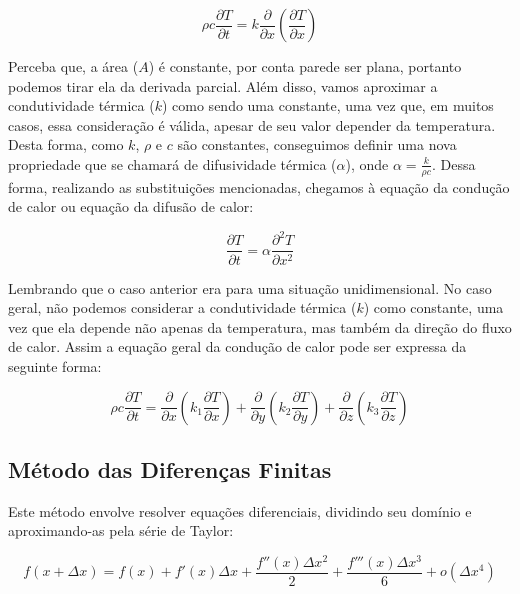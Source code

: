 \documentclass[final,5p,times,twocolumn]{elsarticle}
\begin{document}
\begin{equation*}
    \rho c\frac{\partial T}{\partial t} = k\frac{\partial}{\partial x}(\frac{\partial T}{\partial x})
\end{equation*}

Perceba que, a área ($A$) é constante, por conta parede ser plana, portanto podemos tirar ela da derivada parcial. Além disso, vamos aproximar a condutividade térmica ($k$) como sendo uma constante, uma vez que, em muitos casos, essa consideração é válida, apesar de seu valor depender da temperatura. Desta forma, como $k$, $\rho$ e $c$ são constantes, conseguimos definir uma nova propriedade que se chamará de difusividade térmica ($\alpha$), onde $\alpha = \frac{k}{\rho c}$.
Dessa forma, realizando as substituições mencionadas, chegamos à equação da condução de calor ou equação da difusão de calor:

\begin{equation}
\label{eq:condução de calor unidimensional}
    \frac{\partial T}{\partial t} = \alpha \frac{\partial^2 T}{\partial x^2}
\end{equation}

Lembrando que o caso anterior era para uma situação unidimensional. No caso geral, não podemos considerar a condutividade térmica ($k$) como constante, uma vez que ela depende não apenas da temperatura, mas também da direção do fluxo de calor. Assim a equação geral da condução de calor pode ser expressa da seguinte forma:

\begin{equation}
\label{eq:condução de calor geral}
    \rho c\frac{\partial T}{\partial t} = \frac{\partial}{\partial x}(k_1\frac{\partial T}{\partial x}) +
                                          \frac{\partial}{\partial y}(k_2\frac{\partial T}{\partial y}) +
                                          \frac{\partial}{\partial z}(k_3\frac{\partial T}{\partial z})
\end{equation}
\subsection{Método das Diferenças Finitas}
\label{sec:Diferenças Finitas}

Este método envolve resolver equações diferenciais, dividindo seu domínio e aproximando-as pela série de Taylor:

\begin{equation}
\label{eq:Difenreça+}
    f(x+\Delta x) = f(x) + f'(x)\Delta x + \frac{f''(x)\Delta x^2}{2} + \frac{f'''(x)\Delta x^3}{6} + o(\Delta x^4)
\end{equation}
\end{document}
